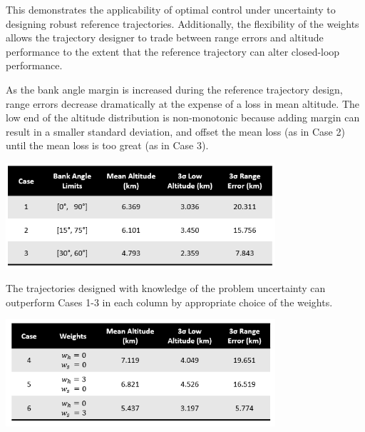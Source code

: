 \documentclass[journal ]{new-aiaa}
\begin{document}
This demonstrates the applicability of optimal control under uncertainty to designing robust reference trajectories. Additionally, the flexibility of the weights allows the trajectory designer to trade between range errors and altitude performance to the extent that the reference trajectory can alter closed-loop performance. 
\begin{table}[h!]
	\centering
	\caption{As the bank angle margin is increased during the reference trajectory design, range errors decrease dramatically at the expense of a loss in mean altitude. The low end of the altitude distribution is non-monotonic because adding margin can result in a smaller standard deviation, and offset the mean loss (as in Case 2) until the mean loss is too great (as in Case 3).}
	\includegraphics[width=0.75\textwidth]{ddp/table_deterministic}
	\label{table_deterministic}
\end{table}
\begin{table}[h!]
	\centering
	\caption{The trajectories designed with knowledge of the problem uncertainty can outperform Cases 1-3 in each column by appropriate choice of the weights.}
	\includegraphics[width=0.75\textwidth]{ddp/table_robust} %
	\label{table_robust}
\end{table}
\end{document}
